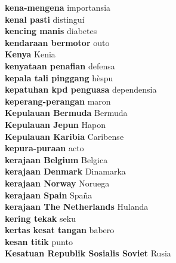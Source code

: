 \textbf{ kena-mengena  } importansia \\
\textbf{ kenal pasti  } distinguí \\
\textbf{ kencing manis  } diabetes \\
\textbf{ kendaraan bermotor  } outo \\
\textbf{ Kenya  } Kenia \\
\textbf{ kenyataan penafian  } defensa \\
\textbf{ kepala tali pinggang  } hèspu \\
\textbf{ kepatuhan kpd penguasa  } dependensia \\
\textbf{ keperang-perangan  } maron \\
\textbf{ Kepulauan Bermuda  } Bermuda \\
\textbf{ Kepulauan Jepun  } Hapon \\
\textbf{ Kepulauan Karibia  } Caribense \\
\textbf{ kepura-puraan  } acto \\
\textbf{ kerajaan Belgium  } Belgica \\
\textbf{ kerajaan Denmark  } Dinamarka \\
\textbf{ kerajaan Norway  } Noruega \\
\textbf{ kerajaan Spain  } Spaña \\
\textbf{ kerajaan The Netherlands  } Hulanda \\
\textbf{ kering tekak  } seku \\
\textbf{ kertas kesat tangan  } babero \\
\textbf{ kesan titik  } punto \\
\textbf{ Kesatuan Republik Sosialis Soviet  } Rusia \\
